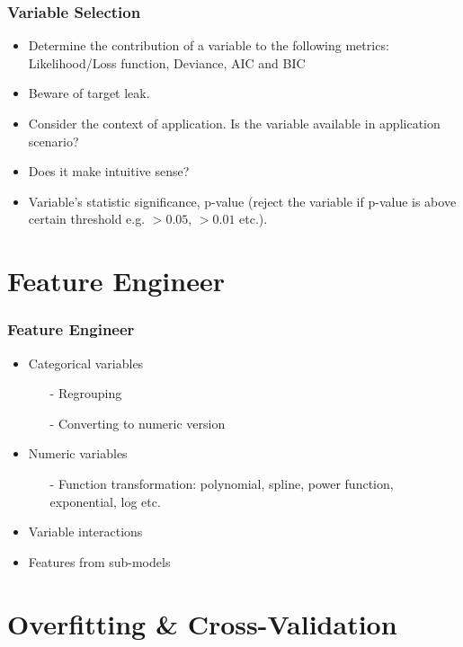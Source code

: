 \documentclass[notheorems, aspectratio=54, tikz,border=10pt,multi]{beamer}
\begin{document}
\begin{frame}
\frametitle{Variable Selection}
\begin{itemize}
\item Determine the contribution of a variable to the following metrics: Likelihood/Loss function, Deviance, AIC and BIC
\item Beware of target leak.
\item Consider the context of application. Is the variable available in application scenario?
\item Does it make intuitive sense?
\item Variable's statistic significance, p-value (reject the variable if p-value is above certain threshold e.g. $>0.05$, $>0.01$ etc.).
\end{itemize}
\end{frame}

\section{Feature Engineer}
\begin{frame}
\frametitle{Feature Engineer}
\begin{itemize}
\item Categorical variables
      \begin{itemize}
        \item[-] Regrouping
        \item[-] Converting to numeric version
      \end{itemize}
\item Numeric variables
      \begin{itemize}
        \item[-] Function transformation: polynomial, spline, power function, exponential, log etc.
      \end{itemize}
      
\item Variable interactions
\item Features from sub-models
\end{itemize}
\end{frame}

\section{Overfitting \& Cross-Validation}
\end{document}
